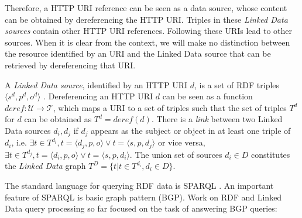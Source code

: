 Therefore, a HTTP URI reference can be seen as a data source, whose content can be obtained by
dereferencing the HTTP URI. Triples in these \emph{Linked Data sources} contain other HTTP URI references. Following these URIs lead to other sources. When it is clear from the context, we will make no distinction between the resource identified by an URI and the Linked Data source that can be retrieved by dereferencing that URI. 

\begin{definition}
  A \emph{Linked Data source}, identified by an HTTP URI $d$, is a set of RDF triples $\langle s^d,p^d,o^d \rangle$ . Dereferencing an
  HTTP URI $d$ can be seen as a function $deref : \mathcal{U} \rightarrow \mathcal{T}$, which maps a URI to a set of triples such that the set of triples $T^d$ for $d$ can be obtained as $T^d = \mathit{deref}(d)$. There is a \emph{link} between two Linked Data
  sources $d_i, d_j$ if $d_j$ appears as the subject or object in at
  least one triple of $d_i$, i.e. $\exists t\in T^{d_i},t=\langle d_j,p,o \rangle \vee t=\langle s,p,d_j \rangle$ or vice versa, $\exists t\in T^{d_j},t=\langle d_i,p,o \rangle \vee t=\langle s,p,d_i \rangle$. The union set of
  sources $d_i \in D$ constitutes the \emph{Linked Data} graph
  $T^D=\{t| t \in T^{d_i}, d_i \in D\}$.

\end{definition}

The standard language for querying RDF data is SPARQL
\cite{prudhommeaux_sparql_2008}. An important feature of SPARQL 
is basic graph pattern (BGP). Work on RDF and Linked Data query processing
so far focused on the task of answering BGP queries: 


